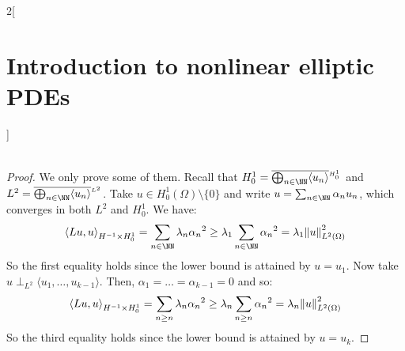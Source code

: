 \documentclass[../../../main_math.tex]{subfiles}
\begin{document}
\begin{multicols}{2}[\section{Introduction to nonlinear elliptic PDEs}]
\begin{theorem}
\begin{align*}
    \end{align*}
  \end{theorem}
  \begin{proof}
    We only prove some of them.
    Recall that $H_0^1=\overline{\bigoplus_{n\in\NN} \langle u_n\rangle}^{{}_{H_0^1}}$ and $L^2=\overline{\bigoplus_{n\in\NN} \langle u_n\rangle}^{{}_{L^2}}$. Take $u\in H_0^1(\Omega)\setminus\{0\}$ and write $u=\sum_{n\in\NN}\alpha_n u_n$, which converges in both $L^2$ and $H_0^1$. We have:
    $$
      {\langle Lu,u\rangle}_{H^{-1}\times H_0^1}= \sum_{n\in\NN}\lambda_n{\alpha_n}^2\geq \lambda_1\sum_{n\in\NN}{\alpha_n}^2=\lambda_1\norm{u}_{L^2(\Omega)}^2
    $$
    So the first equality holds since the lower bound is attained by $u=u_1$. Now take $u\perp_{L^2}\langle u_1,\dots,u_{k-1}\rangle$. Then, $\alpha_1=\dots=\alpha_{k-1}=0$ and so:
    $$
      {\langle Lu,u\rangle}_{H^{-1}\times H_0^1}= \sum_{n\geq n}\lambda_n{\alpha_n}^2\geq \lambda_n\sum_{n\geq n}{\alpha_n}^2=\lambda_n\norm{u}_{L^2(\Omega)}^2
    $$
    So the third equality holds since the lower bound is attained by $u=u_k$.
  \end{proof}

\end{multicols}
\end{document}
